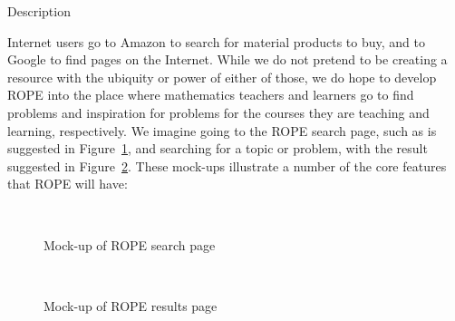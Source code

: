 \documentclass[11pt]{article}
\begin{document}
\begin{section}{Description}

Internet users go to Amazon to search for material products to buy, and to
Google to find pages on the Internet.  While we do not pretend to be
creating a resource with the ubiquity or power of either of those, we do 
hope to develop ROPE into the place where mathematics teachers and
learners go to find problems and inspiration for problems for the courses
they are teaching and learning, respectively.  We imagine going to the ROPE search page,
such as is suggested in Figure~\ref{rope1}, and searching for a topic or
problem, with the result suggested in Figure~\ref{rope2}.  These mock-ups
illustrate a number of the core features that ROPE will have:

\begin{figure}
\begin{center}
\\
\caption{Mock-up of ROPE search page}
\label{rope1}
\end{center}
\end{figure}

\begin{figure}
\begin{center}
\\
\caption{Mock-up of ROPE results page}
\label{rope2}
\end{center}
\end{figure}


\end{section}
\end{document}
